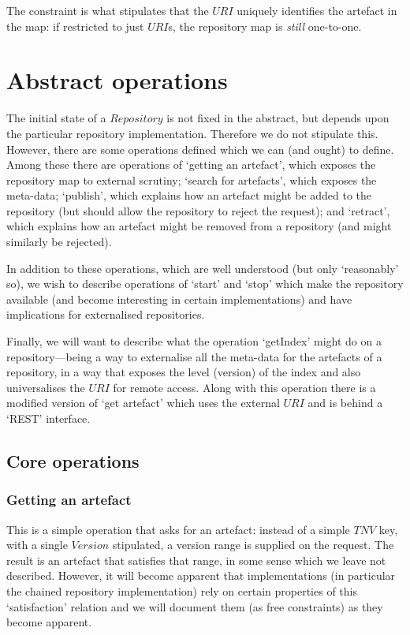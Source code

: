 \documentclass[a4paper,titlepage,twoside,12pt]{article}
\begin{document}
The constraint is what stipulates that the $URI$ uniquely identifies the artefact in the map: if restricted to just $URI$s, the repository map is \emph{still} one-to-one.

\section{Abstract operations}
The initial state of a $Repository$ is not fixed in the abstract, but depends upon the particular repository implementation. Therefore we do not stipulate this. However, there are some operations defined which we can (and ought) to define. Among these there are operations of `getting an artefact', which exposes the repository map to external scrutiny; `search for artefacts', which exposes the meta-data; `publish', which explains how an artefact might be added to the repository (but should allow the repository to reject the request); and `retract', which explains how an artefact might be removed from a repository (and might similarly be rejected).

In addition to these operations, which are well understood (but only `reasonably' so), we wish to describe operations of `start' and `stop' which make the repository available (and become interesting in certain implementations) and have implications for externalised repositories.

Finally, we will want to describe what the operation `getIndex' might do on a repository---being a way to externalise all the meta-data for the artefacts of a repository, in a way that exposes the level (version) of the index and also universalises the $URI$ for remote access. Along with this operation there is a modified version of `get artefact' which uses the external $URI$ and is behind a `REST' interface.

\subsection{Core operations}

\subsubsection{Getting an artefact}
This is a simple operation that asks for an artefact: instead of a simple $TNV$ key, with a single $Version$ stipulated, a version range is supplied on the request. The result is an artefact that satisfies that range, in some sense which we leave not described. However, it will become apparent that implementations (in particular the chained repository implementation) rely on certain properties of this `satisfaction' relation and we will document them (as free constraints) as they become apparent.
\end{document}

